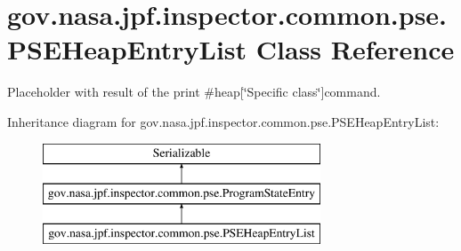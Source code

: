 \hypertarget{classgov_1_1nasa_1_1jpf_1_1inspector_1_1common_1_1pse_1_1_p_s_e_heap_entry_list}{}\section{gov.\+nasa.\+jpf.\+inspector.\+common.\+pse.\+P\+S\+E\+Heap\+Entry\+List Class Reference}
\label{classgov_1_1nasa_1_1jpf_1_1inspector_1_1common_1_1pse_1_1_p_s_e_heap_entry_list}


Placeholder with result of the {\ttfamily print \#heap\mbox{[}\char`\"{}\+Specific class\char`\"{}\mbox{]}{\ttfamily  command. }} 


Inheritance diagram for gov.\+nasa.\+jpf.\+inspector.\+common.\+pse.\+P\+S\+E\+Heap\+Entry\+List\+:\begin{figure}[H]
\begin{center}
\leavevmode
\includegraphics[height=3.000000cm]{classgov_1_1nasa_1_1jpf_1_1inspector_1_1common_1_1pse_1_1_p_s_e_heap_entry_list}
\end{center}
\end{figure}

